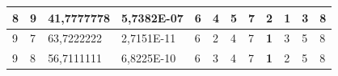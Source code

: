 \documentclass[conference]{IEEEtran}
\begin{document}
\begin{table}[]
\begin{tabular}{|llll|llllllll|}
\multicolumn{1}{|l|}{8}                                                     & \multicolumn{1}{l|}{9}                                                        & \multicolumn{1}{l|}{41,7777778}                                                   & 5,7382E-07                     & \multicolumn{1}{l|}{6}                                                  & \multicolumn{1}{l|}{4}                                                  & \multicolumn{1}{l|}{5}                                                  & \multicolumn{1}{l|}{7}                                                  & \multicolumn{1}{l|}{2}                                                  & \multicolumn{1}{l|}{\textbf{1}}                                         & \multicolumn{1}{l|}{3}                                                  & 8                          \\ \hline
\multicolumn{1}{|l|}{9}                                                     & \multicolumn{1}{l|}{7}                                                        & \multicolumn{1}{l|}{63,7222222}                                                   & 2,7151E-11                     & \multicolumn{1}{l|}{6}                                                  & \multicolumn{1}{l|}{2}                                                  & \multicolumn{1}{l|}{4}                                                  & \multicolumn{1}{l|}{7}                                                  & \multicolumn{1}{l|}{\textbf{1}}                                         & \multicolumn{1}{l|}{3}                                                  & \multicolumn{1}{l|}{5}                                                  & 8                          \\ \hline
\multicolumn{1}{|l|}{9}                                                     & \multicolumn{1}{l|}{8}                                                        & \multicolumn{1}{l|}{56,7111111}                                                   & 6,8225E-10                     & \multicolumn{1}{l|}{6}                                                  & \multicolumn{1}{l|}{3}                                                  & \multicolumn{1}{l|}{4}                                                  & \multicolumn{1}{l|}{7}                                                  & \multicolumn{1}{l|}{\textbf{1}}                                         & \multicolumn{1}{l|}{2}                                                  & \multicolumn{1}{l|}{5}                                                  & 8                          \\ \hline

\end{tabular}
\end{table}
\end{document}
